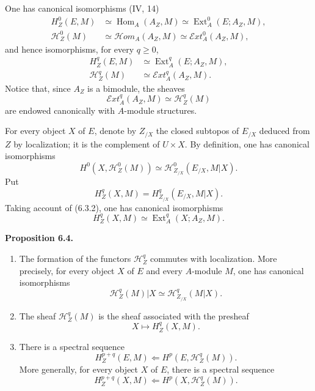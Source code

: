 \documentclass[11pt]{article}
\newcommand{\Hh}{\mathcal{H}}
\newcommand{\Hom}{\operatorname{Hom}}
\newcommand{\Ext}{\operatorname{Ext}}
\newcommand{\Hhom}{\mathcal{H}om}
\newcommand{\Eext}{\mathcal{E}xt}
\newenvironment{statement}[1]{\par\medskip\noindent\textbf{#1.}\ }{\par\medskip}
\begin{document}
One has canonical isomorphisms (IV, 14)
\begin{align*}
        H_Z^0(E,M)&\simeq \Hom_A(A_Z,M)\simeq \Ext_A^0(E;A_Z,M),\tag{6.3.1}\\
        \Hh_Z^0(M)&\simeq \Hhom_A(A_Z,M)\simeq \Eext_A^0(A_Z,M),\tag{6.3.2}
\end{align*}
and hence isomorphisms, for every $q\geq 0$,
\begin{align*}
        H_Z^q(E,M)&\simeq \Ext_A^q(E;A_Z,M),\tag{6.3.3}\\
        \Hh_Z^q(M)&\simeq \Eext_A^q(A_Z,M).\tag{6.3.4}
\end{align*}
Notice that, since $A_Z$ is a bimodule, the sheaves
\[
        \Eext_A^q(A_Z,M)\simeq \Hh_Z^q(M)
\]
are endowed canonically with $A$-module structures.

For every object $X$ of $E$, denote by $Z_{/X}$ the closed subtopos of $E_{/X}$ deduced from $Z$ by localization; it is the complement of $U\times X$. By definition, one has canonical isomorphisms
\begin{equation*}
        H^0(X,\Hh_Z^0(M))\simeq \Hh_{Z_{/X}}^0(E_{/X},M|X).\tag{6.3.5}
\end{equation*}
Put
\begin{equation*}
        H_Z^q(X,M)=H_{Z_{/X}}^q(E_{/X},M|X).\tag{6.3.6}
\end{equation*}
Taking account of (6.3.2), one has canonical isomorphisms
\begin{equation*}
        H_Z^q(X,M)\simeq \Ext_A^q(X;A_Z,M).\tag{6.3.7}
\end{equation*}

\begin{statement}{Proposition 6.4}
\begin{enumerate}[label=\arabic*)]
\item The formation of the functors $\Hh_Z^q$ commutes with localization. More precisely, for every object $X$ of $E$ and every $A$-module $M$, one has canonical isomorphisms
\begin{equation*}
        \Hh_Z^q(M)|X\simeq \Hh_{Z_{/X}}^q(M|X).\tag{6.4.1}
\end{equation*}
\item The sheaf $\Hh_Z^q(M)$ is the sheaf associated with the presheaf
\[
        X\longmapsto H_Z^q(X,M).
\]
\item There is a spectral sequence
\begin{equation*}
        H_Z^{p+q}(E,M)\Longleftarrow H^p(E,\Hh_Z^q(M)).\tag{6.4.2}
\end{equation*}
More generally, for every object $X$ of $E$, there is a spectral sequence
\begin{equation*}
        H_Z^{p+q}(X,M)\Longleftarrow H^p(X,\Hh_Z^q(M)).\tag{6.4.3}
\end{equation*}
\end{enumerate}
\end{statement}
\end{document}

